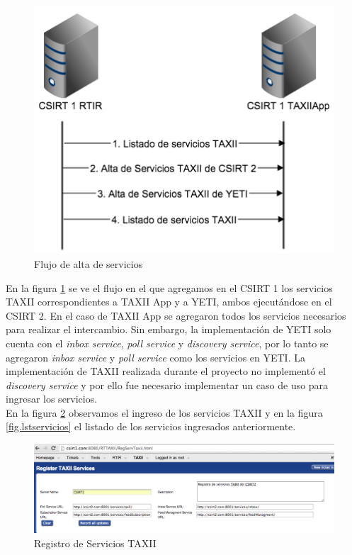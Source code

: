 \begin{figure}[H]
	\centering
	\includegraphics[scale=0.6]{flujos/flujo1-4.png}
	\caption{Flujo de alta de servicios}
	\label{fig.flujos14}
\end{figure}

En la figura \ref{fig.flujos14} se ve el flujo en el que agregamos en el CSIRT 1 los servicios TAXII correspondientes a TAXII App y a YETI, ambos ejecutándose en el CSIRT 2.
En el caso de TAXII App se agregaron todos los servicios necesarios para realizar el intercambio. Sin embargo, la implementación de YETI solo cuenta con el \textit{inbox service}, \textit{poll service} y \textit{discovery service}, por lo tanto se agregaron \textit{inbox service} y \textit{poll service} como los servicios en YETI. La implementación de TAXII realizada durante el proyecto no implementó el \textit{discovery service} y por ello fue necesario implementar un caso de uso para ingresar los servicios. \\
\bigskip
En la figura \ref{fig.regservicios} observamos el ingreso de los servicios TAXII y en la figura \ref{fig.lstservicios} el listado de los servicios ingresados anteriormente.

\begin{figure}[H]
	\centering
	\includegraphics[scale=0.4]{caso-de-estudio/RegistroServicios.png}
	\caption{Registro de Servicios TAXII}
	\label{fig.regservicios}
\end{figure}

